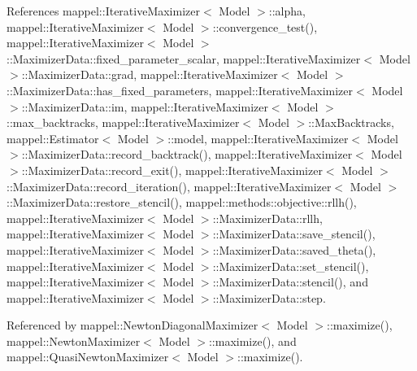 References mappel\+::\+Iterative\+Maximizer$<$ Model $>$\+::alpha, mappel\+::\+Iterative\+Maximizer$<$ Model $>$\+::convergence\+\_\+test(), mappel\+::\+Iterative\+Maximizer$<$ Model $>$\+::\+Maximizer\+Data\+::fixed\+\_\+parameter\+\_\+scalar, mappel\+::\+Iterative\+Maximizer$<$ Model $>$\+::\+Maximizer\+Data\+::grad, mappel\+::\+Iterative\+Maximizer$<$ Model $>$\+::\+Maximizer\+Data\+::has\+\_\+fixed\+\_\+parameters, mappel\+::\+Iterative\+Maximizer$<$ Model $>$\+::\+Maximizer\+Data\+::im, mappel\+::\+Iterative\+Maximizer$<$ Model $>$\+::max\+\_\+backtracks, mappel\+::\+Iterative\+Maximizer$<$ Model $>$\+::\+Max\+Backtracks, mappel\+::\+Estimator$<$ Model $>$\+::model, mappel\+::\+Iterative\+Maximizer$<$ Model $>$\+::\+Maximizer\+Data\+::record\+\_\+backtrack(), mappel\+::\+Iterative\+Maximizer$<$ Model $>$\+::\+Maximizer\+Data\+::record\+\_\+exit(), mappel\+::\+Iterative\+Maximizer$<$ Model $>$\+::\+Maximizer\+Data\+::record\+\_\+iteration(), mappel\+::\+Iterative\+Maximizer$<$ Model $>$\+::\+Maximizer\+Data\+::restore\+\_\+stencil(), mappel\+::methods\+::objective\+::rllh(), mappel\+::\+Iterative\+Maximizer$<$ Model $>$\+::\+Maximizer\+Data\+::rllh, mappel\+::\+Iterative\+Maximizer$<$ Model $>$\+::\+Maximizer\+Data\+::save\+\_\+stencil(), mappel\+::\+Iterative\+Maximizer$<$ Model $>$\+::\+Maximizer\+Data\+::saved\+\_\+theta(), mappel\+::\+Iterative\+Maximizer$<$ Model $>$\+::\+Maximizer\+Data\+::set\+\_\+stencil(), mappel\+::\+Iterative\+Maximizer$<$ Model $>$\+::\+Maximizer\+Data\+::stencil(), and mappel\+::\+Iterative\+Maximizer$<$ Model $>$\+::\+Maximizer\+Data\+::step.



Referenced by mappel\+::\+Newton\+Diagonal\+Maximizer$<$ Model $>$\+::maximize(), mappel\+::\+Newton\+Maximizer$<$ Model $>$\+::maximize(), and mappel\+::\+Quasi\+Newton\+Maximizer$<$ Model $>$\+::maximize().

